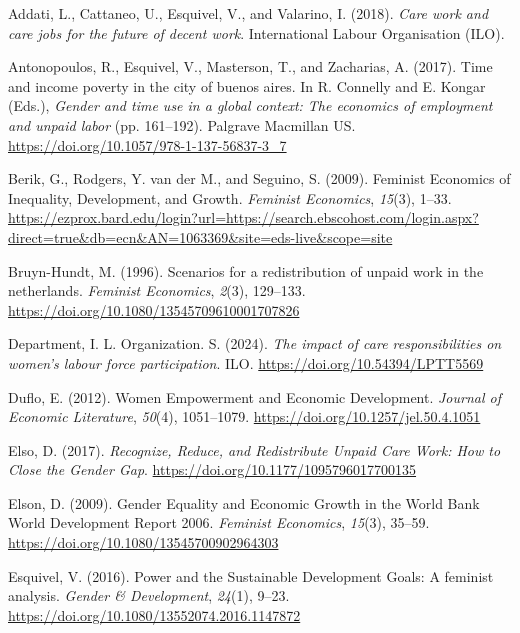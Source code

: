 \documentclass[
  11pt,
]{article}
\newlength{\cslhangindent}
\newenvironment{CSLReferences}[2] %
 {\begin{list}{}{%
  \setlength{\itemindent}{0pt}
  \setlength{\leftmargin}{0pt}
  \setlength{\parsep}{0pt}
  \ifodd #1
   \setlength{\leftmargin}{\cslhangindent}
   \setlength{\itemindent}{-1\cslhangindent}
  \fi
  \setlength{\itemsep}{#2\baselineskip}}}
 {\end{list}}
\begin{document}
\label{refs}
\begin{CSLReferences}{1}{0}
Addati, L., Cattaneo, U., Esquivel, V., and Valarino, I. (2018).
\emph{Care work and care jobs for the future of decent work}.
International Labour Organisation (ILO).

Antonopoulos, R., Esquivel, V., Masterson, T., and Zacharias, A. (2017).
Time and income poverty in the city of buenos aires. In R. Connelly and
E. Kongar (Eds.), \emph{Gender and time use in a global context: The
economics of employment and unpaid labor} (pp. 161--192). Palgrave
Macmillan US. \url{https://doi.org/10.1057/978-1-137-56837-3_7}

Berik, G., Rodgers, Y. van der M., and Seguino, S. (2009). Feminist
{Economics} of {Inequality}, {Development}, and {Growth}. \emph{Feminist
Economics}, \emph{15}(3), 1--33.
\url{https://ezprox.bard.edu/login?url=https://search.ebscohost.com/login.aspx?direct=true&db=ecn&AN=1063369&site=eds-live&scope=site}

Bruyn-Hundt, M. (1996). Scenarios for a redistribution of unpaid work in
the netherlands. \emph{Feminist Economics}, \emph{2}(3), 129--133.
\url{https://doi.org/10.1080/13545709610001707826}

Department, I. L. Organization. S. (2024). \emph{The impact of care
responsibilities on women's labour force participation}. ILO.
\url{https://doi.org/10.54394/LPTT5569}

Duflo, E. (2012). Women {Empowerment} and {Economic} {Development}.
\emph{Journal of Economic Literature}, \emph{50}(4), 1051--1079.
\url{https://doi.org/10.1257/jel.50.4.1051}

Elso, D. (2017). \emph{Recognize, {Reduce}, and {Redistribute} {Unpaid}
{Care} {Work}: {How} to {Close} the {Gender} {Gap}}.
\url{https://doi.org/10.1177/1095796017700135}

Elson, D. (2009). Gender {Equality} and {Economic} {Growth} in the
{World} {Bank} {World} {Development} {Report} 2006. \emph{Feminist
Economics}, \emph{15}(3), 35--59.
\url{https://doi.org/10.1080/13545700902964303}

Esquivel, V. (2016). Power and the {Sustainable} {Development} {Goals}:
A feminist analysis. \emph{Gender \& Development}, \emph{24}(1), 9--23.
\url{https://doi.org/10.1080/13552074.2016.1147872}


\end{CSLReferences}
\end{document}

